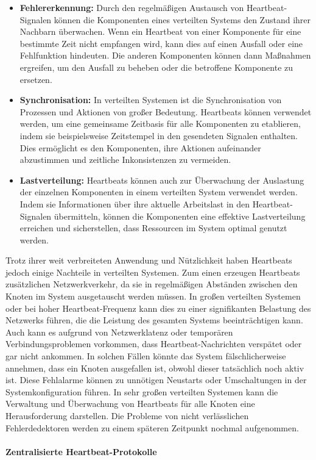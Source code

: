 \documentclass[../vs-script-first-v01.tex]{subfiles}
\begin{document}
\begin{itemize}
\item \textbf{Fehlererkennung:} Durch den regelmäßigen Austausch von Heartbeat-Signalen können die Komponenten eines verteilten Systems den Zustand ihrer Nachbarn überwachen. Wenn ein Heartbeat von einer Komponente für eine bestimmte Zeit nicht empfangen wird, kann dies auf einen Ausfall oder eine Fehlfunktion hindeuten. Die anderen Komponenten können dann Maßnahmen ergreifen, um den Ausfall zu beheben oder die betroffene Komponente zu ersetzen.
\item \textbf{Synchronisation:} In verteilten Systemen ist die Synchronisation von Prozessen und Aktionen von großer Bedeutung. Heartbeats können verwendet werden, um eine gemeinsame Zeitbasis für alle Komponenten zu etablieren, indem sie beispielsweise Zeitstempel in den gesendeten Signalen enthalten. Dies ermöglicht es den Komponenten, ihre Aktionen aufeinander abzustimmen und zeitliche Inkonsistenzen zu vermeiden.
\item \textbf{Lastverteilung:} Heartbeats können auch zur Überwachung der Auslastung der einzelnen Komponenten in einem verteilten System verwendet werden. Indem sie Informationen über ihre aktuelle Arbeitslast in den Heartbeat-Signalen übermitteln, können die Komponenten eine effektive Lastverteilung erreichen und sicherstellen, dass Ressourcen im System optimal genutzt werden.
\end{itemize}
Trotz ihrer weit verbreiteten Anwendung und Nützlichkeit haben Heartbeats jedoch einige Nachteile in verteilten Systemen. Zum einen erzeugen Heartbeats zusätzlichen Netzwerkverkehr, da sie in regelmäßigen Abständen zwischen den Knoten im System ausgetauscht werden müssen. In großen verteilten Systemen oder bei hoher Heartbeat-Frequenz kann dies zu einer signifikanten Belastung des Netzwerks führen, die die Leistung des gesamten Systems beeinträchtigen kann. Auch kann es aufgrund von Netzwerklatenz oder temporären Verbindungsproblemen vorkommen, dass Heartbeat-Nachrichten verspätet oder gar nicht ankommen. In solchen Fällen könnte das System fälschlicherweise annehmen, dass ein Knoten ausgefallen ist, obwohl dieser tatsächlich noch aktiv ist. Diese Fehlalarme können zu unnötigen Neustarts oder Umschaltungen in der Systemkonfiguration führen.
In sehr großen verteilten Systemen kann die Verwaltung und Überwachung von Heartbeats für alle Knoten eine Herausforderung darstellen.
Die Probleme von nicht verlässlichen Fehlerdedektoren werden zu einem späteren Zeitpunkt nochmal aufgenommen. 
\paragraph{Zentralisierte Heartbeat-Protokolle }\mbox\\
\end{document}
